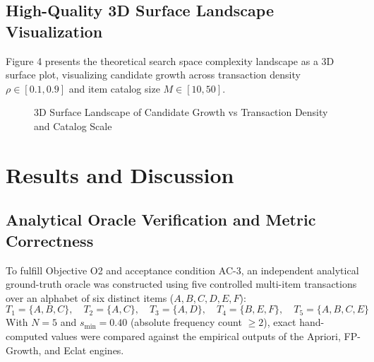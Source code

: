 \documentclass[11pt,a4paper]{article}
\begin{document}
\subsection{High-Quality 3D Surface Landscape Visualization}
Figure 4 presents the theoretical search space complexity landscape as a 3D surface plot, visualizing candidate growth across transaction density $\rho \in [0.1, 0.9]$ and item catalog size $M \in [10, 50]$.

\begin{figure}[!ht]
\centering
{}
\caption{3D Surface Landscape of Candidate Growth vs Transaction Density and Catalog Scale}
\end{figure}

\vspace{0.7em}

\section{Results and Discussion}

\subsection{Analytical Oracle Verification and Metric Correctness}
To fulfill Objective O2 and acceptance condition AC-3, an independent analytical ground-truth oracle was constructed using five controlled multi-item transactions over an alphabet of six distinct items ($A, B, C, D, E, F$):
\begin{equation*}
T_1 = \{A, B, C\}, \quad T_2 = \{A, C\}, \quad T_3 = \{A, D\}, \quad T_4 = \{B, E, F\}, \quad T_5 = \{A, B, C, E\}
\end{equation*}
With $N = 5$ and $s_{\min} = 0.40$ (absolute frequency count $\ge 2$), exact hand-computed values were compared against the empirical outputs of the Apriori, FP-Growth, and Eclat engines.
\end{document}

